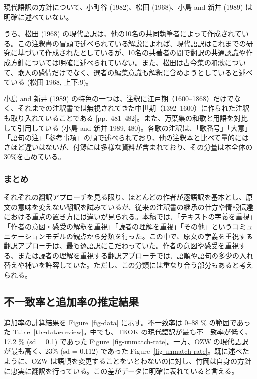 \documentclass[
  letterpaper,
  DIV=11,
  numbers=noendperiod]{scrartcl}
\begin{document}
現代語訳の方針について、小町谷 (1982)、松田 (1968)、小島 and 新井 (1989)
は明確に述べていない。

うち、松田 (1968)
の現代語訳は、他の10名の共同執筆者によって作成されている。この注釈書の冒頭で述べられている解説によれば、現代語訳はこれまでの研究に基づいて作成されたとしているが、10名の共著者の間で翻訳の共通認識や作成方針については明確に述べられていない。また、松田は古今集の和歌について、歌人の感情だけでなく、選者の編集意識も解釈に含めようとしていると述べている
(松田 1968, 上下:9)。

小島 and 新井 (1989)
の特色の一つは、注釈に江戸期（1600--1868）だけでなく、それまでの注釈書では無視されてきた中世期（1392--1600）に作られた注釈も取り入れていることである
{[}pp.~481--482{]}。また、万葉集の和歌と用語を対比して引用している (小島
and 新井 1989,
480)。各歌の注釈は、「歌番号」「大意」「語句の注」「参考事項」の順で述べられており、他の注釈本と比べて量的にはさほど違いはないが、付録には多様な資料が含まれており、その分量は本全体の30\%を占めている。

\subsubsection*{まとめ}\label{ux307eux3068ux3081}

それぞれの翻訳アプローチを見る限り、ほとんどの作者が逐語訳を基本とし、原文の意味を変えない翻訳を試みているが、従来の注釈書の継承の仕方や情報伝達における重点の置き方には違いが見られる。本稿では、「テキストの字義を重視」「作者の意図・感受の解釈を重視」「読者の理解を重視」「その他」というコミュニケーションモデルの観点から分類を行った。この中で、原文の字義を重視する翻訳アプローチは、最も逐語訳にこだわっていた。作者の意図や感受を重視する、または読者の理解を重視する翻訳アプローチでは、語順や語句の多少の入れ替えや補いを許容していた。ただし、この分類には重なり合う部分もあると考えられる。

\subsection{不一致率と追加率の推定結果}\label{ux4e0dux4e00ux81f4ux7387ux3068ux8ffdux52a0ux7387ux306eux63a8ux5b9aux7d50ux679c}

追加率の計算結果を Figure~\ref{fig-data} に示す。不一致率は 0--88 \%
の範囲であった Table~\ref{tbl-data-review}。中でも、TKOK
の現代語訳が最も不一致率が低く、17.2 \% (sd = 0.1) であった
Figure~\ref{fig-unmatch-rate}。一方、OZW の現代語訳が最も高く、23\% (sd
= 0.112) であった Figure~\ref{fig-unmatch-rate}。既に述べたように、OZW
は語順を変更することをいとわないのに対し、竹岡は自身の方針に忠実に翻訳を行っている。この差がデータに明確に表れていると言える。
\end{document}
